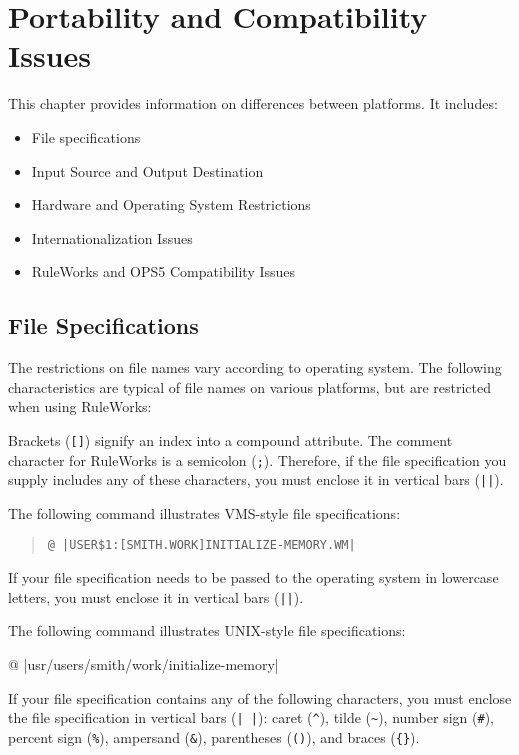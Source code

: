 \chapter{Portability and Compatibility Issues}
\label{c:portability}

This chapter provides information on differences between platforms. It
includes:
\begin{itemize}
\item File specifications
\item Input Source and Output Destination
\item Hardware and Operating System Restrictions
\item Internationalization Issues 
\item RuleWorks and OPS5 Compatibility Issues
\end{itemize}

\section{File Specifications}

The restrictions on file names vary according to operating system. The
following characteristics are typical of file names on various
platforms, but are restricted when using RuleWorks:

Brackets (\verb|[]|) signify an index into a compound attribute. The
comment character for RuleWorks is a semicolon (\verb|;|). Therefore,
if the file specification you supply includes any of these characters,
you must enclose it in vertical bars (\verb,||,).

The following command illustrates VMS-style file specifications:
\begin{quote}
\begin{verbatim}
@ |USER$1:[SMITH.WORK]INITIALIZE-MEMORY.WM|
\end{verbatim}
\end{quote}

If your file specification needs to be passed to the operating system
in lowercase letters, you must enclose it in vertical bars (\verb,||,).

The following command illustrates UNIX-style file specifications:
\begin{qv}
@ |usr/users/smith/work/initialize-memory|
\end{qv}

If your file specification contains any of the following characters,
you must enclose the file specification in vertical bars (\verb,| |,):
caret (\verb|^|), tilde (\verb|~|), number sign (\verb|#|), percent
sign (\verb|%|), ampersand (\verb|&|), parentheses (\verb|()|), and
braces (\verb|{}|).

